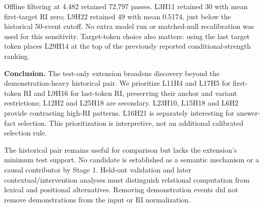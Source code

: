 \documentclass[11pt,a4paper]{article}
\begin{document}
Offline filtering at 4.482 retained 72,797 passes. L3H11 retained 30 with mean first-target RI zero; L9H22 retained 49 with mean 0.5174, just below the historical 50-event cutoff. No extra model run or matched-null recalibration was used for this sensitivity. Target-token choice also matters: using the last target token places L29H14 at the top of the previously reported conditional-strength ranking.

\textbf{Conclusion.} The test-only extension broadens discovery beyond the demonstration-heavy historical pair. We prioritize L11H4 and L17H5 for first-token RI and L9H16 for last-token RI, preserving their anchor and variant restrictions; L12H2 and L25H18 are secondary. L23H10, L15H18 and L6H2 provide contrasting high-RI patterns. L16H21 is separately interesting for answer-fact selection. This prioritization is interpretive, not an additional calibrated selection rule.

The historical pair remains useful for comparison but lacks the extension's minimum test support. No candidate is established as a semantic mechanism or a causal contributor by Stage 1. Held-out validation and later contextual/intervention analyses must distinguish relational computation from lexical and positional alternatives. Removing demonstration events did not remove demonstrations from the input or RI normalization.
\end{document}
